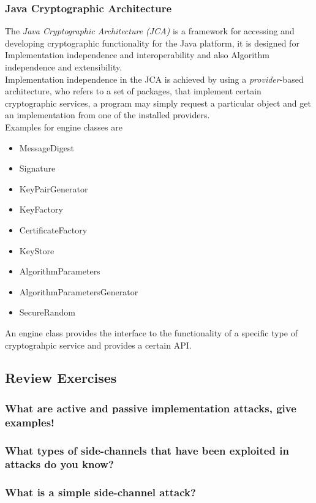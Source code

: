 \documentclass[a4paper, 10 pt, conference]{ieeeconf}
\begin{document}
\vspace{0.5cm}
\subsubsection{\textbf{Java Cryptographic Architecture}}
The \emph{Java Cryptographic Architecture (JCA)} is a framework for accessing and developing cryptographic functionality for the Java platform, it is designed for Implementation independence and interoperability and also Algorithm independence and extensibility. \\
Implementation independence in the JCA is achieved by using a \emph{provider}-based architecture, who refers to a set of packages, that implement certain cryptographic services, a program may simply request a particular object and get an implementation from one of the installed providers. \\
Examples for engine classes are
\begin{itemize}
\item MessageDigest
\item Signature
\item KeyPairGenerator
\item KeyFactory
\item CertificateFactory
\item KeyStore
\item AlgorithmParameters
\item AlgorithmParametersGenerator
\item SecureRandom
\end{itemize}
An engine class provides the interface to the functionality of a specific type of cryptograhpic service and provides a certain API. 


\subsection{\textbf{Review Exercises}}
\subsubsection{\textbf{What are active and passive implementation attacks, give examples!}}

\subsubsection{\textbf{What types of side-channels that have been exploited in attacks do you know?}}

\subsubsection{\textbf{What is a simple side-channel attack?}}
\end{document}
